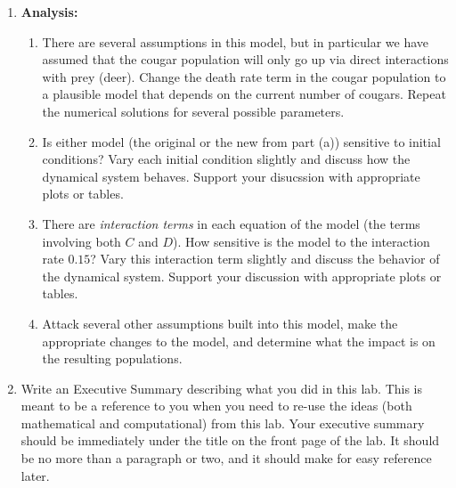 \begin{problem}
\begin{enumerate}
    \item {\bf Analysis:} 
        \begin{enumerate}
            \item There are several assumptions in this model, but in particular we have
                assumed that the cougar population will only go up via direct interactions
                with prey (deer).  Change the death rate term in the cougar population to
                a plausible model that depends on the current number of cougars.  Repeat
                the numerical solutions for several possible parameters.
            \item Is either model (the original or the new from part (a)) sensitive to
                initial conditions?  Vary each initial condition slightly and discuss how
                the dynamical system behaves. Support your disucssion with appropriate
                plots or tables.
            \item There are {\it interaction terms} in each equation of the model (the
                terms involving both $C$ and $D$).  How sensitive is the model to the
                interaction rate $0.15$?  Vary this interaction term slightly and discuss
                the behavior of the dynamical system. Support your discussion with
                appropriate plots or tables.
            \item Attack several other assumptions built into this model, make the
                appropriate changes to the model, and determine what the impact is on the
                resulting populations.
        \end{enumerate}



    \item Write an Executive Summary describing what you did in this lab.  This is meant
        to be a reference to you when you need to re-use the ideas (both mathematical and
        computational) from this lab. Your executive summary should be immediately under
        the title on the front page of the lab.  It should be no more than a paragraph or
        two, and it should make for easy reference later.

\end{enumerate}
\end{problem}

